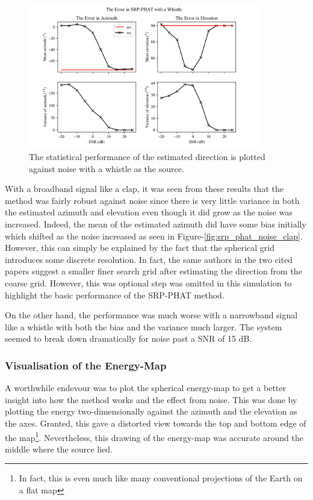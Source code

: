 \documentclass[notitlepage]{report}
\begin{document}
\begin{figure}[H]
\includegraphics[width=0.9\textwidth]{../Python/srp_phat/noise/whistle/plots.png}
\centering
\caption{The statistical performance of the estimated direction is plotted against noise with a whistle as the source.}
\label{fig:srp_phat_noise_whistle}
\centering
\end{figure}

With a broadband signal like a clap, it was seen from these results that the method was fairly robust against noise since there is very little variance in both the estimated azimuth and elevation even though it did grow as the noise was increased. Indeed, the mean of the estimated azimuth did have some bias initially which shifted as the noise increased as seen in Figure-\ref{fig:srp_phat_noise_clap}. However, this can simply be explained by the fact that the spherical grid introduces some discrete resolution. In fact, the same authors in the two cited papers \cite{valin_localization_2004} \cite{valin_robust_2007} suggest a smaller finer search grid after estimating the direction from the coarse grid. However, this was optional step was omitted in this simulation to highlight the basic performance of the SRP-PHAT method.

On the other hand, the performance was much worse with a narrowband signal like a whistle with both the bias and the variance much larger. The system seemed to break down dramatically for noise past a SNR of 15 \si{dB}. 

\subsubsection{Visualisation of the Energy-Map} \label{Visualisation_of_the_Energy_Map}

A worthwhile endevour was to plot the spherical energy-map to get a better insight into how the method works and the effect from noise. This was done by plotting the energy two-dimensionally against the azimuth and the elevation as the axes. Granted, this gave a distorted view towards the top and bottom edge of the map\footnote{In fact, this is even much like many conventional projections of the Earth on a flat map}. Nevertheless, this drawing of the energy-map was accurate around the middle where the source lied.
\end{document}
